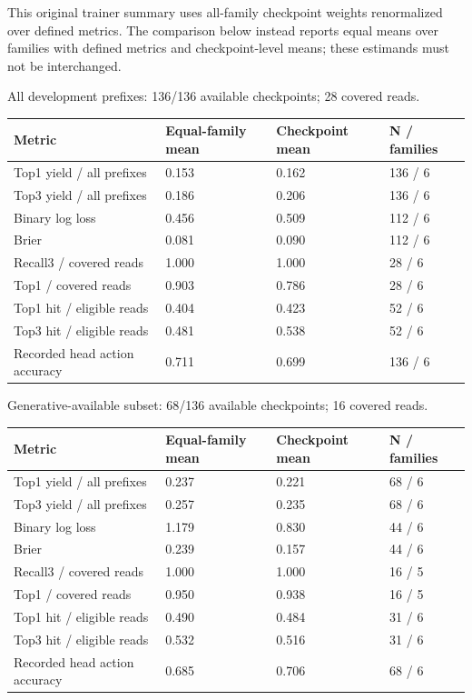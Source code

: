 \documentclass[10pt]{article}
\begin{document}
This original trainer summary uses all-family checkpoint weights renormalized over defined metrics. The comparison below instead reports equal means over families with defined metrics and checkpoint-level means; these estimands must not be interchanged.

All development prefixes: 136/136 available checkpoints; 28 covered reads.

\begin{longtable}[]{@{}llll@{}}
\toprule\noalign{}
Metric & Equal-family mean & Checkpoint mean & N / families \\
\midrule\noalign{}
\endhead
\bottomrule\noalign{}
\endlastfoot
Top1 yield / all prefixes & 0.153 & 0.162 & 136 / 6 \\
Top3 yield / all prefixes & 0.186 & 0.206 & 136 / 6 \\
Binary log loss & 0.456 & 0.509 & 112 / 6 \\
Brier & 0.081 & 0.090 & 112 / 6 \\
Recall3 / covered reads & 1.000 & 1.000 & 28 / 6 \\
Top1 / covered reads & 0.903 & 0.786 & 28 / 6 \\
Top1 hit / eligible reads & 0.404 & 0.423 & 52 / 6 \\
Top3 hit / eligible reads & 0.481 & 0.538 & 52 / 6 \\
Recorded head action accuracy & 0.711 & 0.699 & 136 / 6 \\
\end{longtable}

Generative-available subset: 68/136 available checkpoints; 16 covered reads.

\begin{longtable}[]{@{}llll@{}}
\toprule\noalign{}
Metric & Equal-family mean & Checkpoint mean & N / families \\
\midrule\noalign{}
\endhead
\bottomrule\noalign{}
\endlastfoot
Top1 yield / all prefixes & 0.237 & 0.221 & 68 / 6 \\
Top3 yield / all prefixes & 0.257 & 0.235 & 68 / 6 \\
Binary log loss & 1.179 & 0.830 & 44 / 6 \\
Brier & 0.239 & 0.157 & 44 / 6 \\
Recall3 / covered reads & 1.000 & 1.000 & 16 / 5 \\
Top1 / covered reads & 0.950 & 0.938 & 16 / 5 \\
Top1 hit / eligible reads & 0.490 & 0.484 & 31 / 6 \\
Top3 hit / eligible reads & 0.532 & 0.516 & 31 / 6 \\
Recorded head action accuracy & 0.685 & 0.706 & 68 / 6 \\
\end{longtable}
\end{document}
